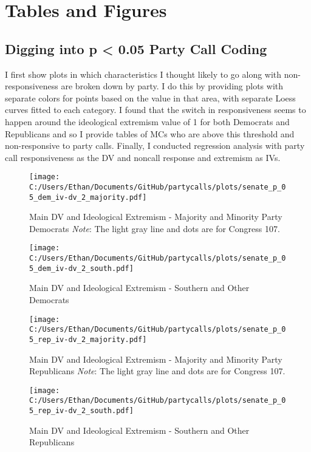 \documentclass[12pt]{article}
\begin{document}
\section{Tables and Figures}

\subsection{Digging into p < 0.05 Party Call Coding}

I first show plots in which characteristics I thought likely to go along with non-responsiveness are broken down by party. I do this by providing plots with separate colors for points based on the value in that area, with separate Loess curves fitted to each category. I found that the switch in responsiveness seems to happen around the ideological extremism value of 1 for both Democrats and Republicans and so I provide tables of MCs who are above this threshold and non-responsive to party calls. Finally, I conducted regression analysis with party call responsiveness as the DV and noncall response and extremism as IVs.

\begin{figure}[h]
	\caption{Main DV and Ideological Extremism - Majority and Minority Party Democrats \textit{Note}: The light gray line and dots are for Congress 107.}
	\texttt{[image: C:/Users/Ethan/Documents/GitHub/partycalls/plots/senate\_p\_05\_dem\_iv-dv\_2\_majority.pdf]}
\end{figure}

\begin{figure}[h]
	\caption{Main DV and Ideological Extremism - Southern and Other Democrats}
	\texttt{[image: C:/Users/Ethan/Documents/GitHub/partycalls/plots/senate\_p\_05\_dem\_iv-dv\_2\_south.pdf]}
\end{figure}

\begin{figure}[h]
	\caption{Main DV and Ideological Extremism - Majority and Minority Party Republicans \textit{Note}: The light gray line and dots are for Congress 107.}
	\texttt{[image: C:/Users/Ethan/Documents/GitHub/partycalls/plots/senate\_p\_05\_rep\_iv-dv\_2\_majority.pdf]}
\end{figure}

\begin{figure}[h]
	\caption{Main DV and Ideological Extremism - Southern and Other Republicans}
	\texttt{[image: C:/Users/Ethan/Documents/GitHub/partycalls/plots/senate\_p\_05\_rep\_iv-dv\_2\_south.pdf]}
\end{figure}
\end{document}
